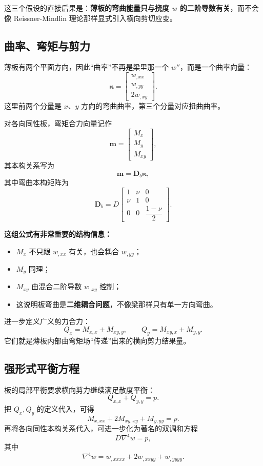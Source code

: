 \documentclass[11pt, a4paper, UTF8]{ctexart}
\begin{document}
这三个假设的直接后果是：\textbf{薄板的弯曲能量只与挠度 $w$ 的二阶导数有关}，而不会像 Reissner-Mindlin 理论那样显式引入横向剪切应变。

\subsection{曲率、弯矩与剪力}
薄板有两个平面方向，因此“曲率”不再是梁里那一个 $w''$，而是一个曲率向量：
\[
\bm{\kappa} =
\begin{bmatrix}
w_{,xx} \\
w_{,yy} \\
2w_{,xy}
\end{bmatrix}.
\]
这里前两个分量是 $x$、$y$ 方向的弯曲曲率，第三个分量对应扭曲曲率。

对各向同性板，弯矩合力向量记作
\[
\bm{m} =
\begin{bmatrix}
M_x \\
M_y \\
M_{xy}
\end{bmatrix},
\]
其本构关系写为
\[
\bm{m} = \bm{D}_b \bm{\kappa},
\]
其中弯曲本构矩阵为
\[
\bm{D}_b
=
D
\begin{bmatrix}
1 & \nu & 0 \\
\nu & 1 & 0 \\
0 & 0 & \dfrac{1-\nu}{2}
\end{bmatrix}.
\]

\textbf{这组公式有非常重要的结构信息：}
\begin{itemize}
    \item $M_x$ 不只跟 $w_{,xx}$ 有关，也会耦合 $w_{,yy}$；
    \item $M_y$ 同理；
    \item $M_{xy}$ 由混合二阶导数 $w_{,xy}$ 控制；
    \item 这说明板弯曲是\textbf{二维耦合问题}，不像梁那样只有单一方向弯曲。
\end{itemize}

进一步定义广义剪力合力：
\[
Q_x = M_{x,x} + M_{xy,y},
\qquad
Q_y = M_{xy,x} + M_{y,y}.
\]
它们就是薄板内部由弯矩场“传递”出来的横向剪力结果量。

\subsection{强形式平衡方程}
板的局部平衡要求横向剪力继续满足散度平衡：
\[
Q_{x,x} + Q_{y,y} = p.
\]
把 $Q_x,Q_y$ 的定义代入，可得
\[
M_{x,xx} + 2M_{xy,xy} + M_{y,yy} = p.
\]
再将各向同性本构关系代入，可进一步化为著名的双调和方程
\[
D \nabla^4 w = p,
\]
其中
\[
\nabla^4 w = w_{,xxxx} + 2w_{,xxyy} + w_{,yyyy}.
\]
\end{document}
